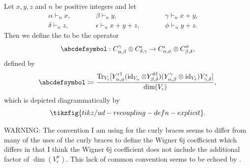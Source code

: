 \documentclass[notitlepage, 10pt]{article}
\begin{document}
\begin{defn}
    \label{defn:ud_recoupling_operator}
    Let $x,y,z$ and $n$ be positive integers and let
    \begin{equation}
        \label{eq:xyz_sized_young_diagrams_1}
        \begin{alignedat}{3}
             &\alpha \vdash_{n} x, \qquad 
            &&\beta \vdash_{n} y, \qquad
            &&\gamma \vdash_{n} x+y, \qquad\\
             &\delta \vdash_{n} z, \qquad
            &&\epsilon \vdash_{n} x+y+z, \qquad
            &&\phi \vdash_{n} y+z.
        \end{alignedat}
    \end{equation}
    Then we define the  to be the operator
    \begin{equation}
        \abcdefsymbol
        :
        C^{\gamma}_{\alpha,\beta} \ot C^{\epsilon}_{\delta,\gamma} \to C^{\epsilon}_{\alpha, \phi} \ot C^{\phi}_{\beta,\delta},
    \end{equation}
    defined by
    \begin{equation}
        \abcdefsymbol 
        \coloneqq
        \frac{
            \Tr_{V_{\epsilon}}[
            Y_{\alpha,\phi}^{\epsilon\dagger}
            (\id_{V_{\alpha}}\ot Y_{\beta,\delta}^{\phi\dagger})
            (Y_{\alpha,\beta}^{\gamma}\ot\id_{V_{\delta}})
            Y_{\gamma,\delta}^{\epsilon}
            ]
        }{\dim(V_{\epsilon})},
    \end{equation}
    which is depicted diagrammatically by
    \begin{equation}
        \tikzfig{tikz/ud-recoupling-defn-explicit}.
    \end{equation}
\end{defn}
{\color{red}
    WARNING: The convention I am using for the curly braces seems to differ from many of the uses of the curly braces to define the Wigner 6j coefficient which differs in that I think the Wigner 6j coefficient does not include the additional factor of $\dim(V_{\epsilon}^{n})$.
    This lack of common convention seems to be echoed by \citeauthor{coquereaux2023integer} \cite{coquereaux2023integer}.
}
\end{document}
